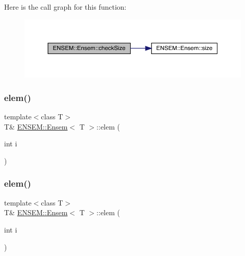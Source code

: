 Here is the call graph for this function\+:
\nopagebreak
\begin{figure}[H]
\begin{center}
\leavevmode
\includegraphics[width=350pt]{d7/d3e/classENSEM_1_1Ensem_a4c06fadea7b637572de2347739b78004_cgraph}
\end{center}
\end{figure}
\mbox{\label{classENSEM_1_1Ensem_a4927ebde99b1f0a03cdcfe3fc88458a5}} 
\subsubsection{\texorpdfstring{elem()}{elem()}\hspace{0.1cm}{\footnotesize\ttfamily [1/6]}}
{\footnotesize\ttfamily template$<$class T$>$ \\
T\& \mbox{\hyperlink{classENSEM_1_1Ensem}{E\+N\+S\+E\+M\+::\+Ensem}}$<$ T $>$\+::elem (\begin{DoxyParamCaption}\item[{int}]{i }\end{DoxyParamCaption})\hspace{0.3cm}{\ttfamily [inline]}}

\mbox{\label{classENSEM_1_1Ensem_a4927ebde99b1f0a03cdcfe3fc88458a5}} 
\subsubsection{\texorpdfstring{elem()}{elem()}\hspace{0.1cm}{\footnotesize\ttfamily [2/6]}}
{\footnotesize\ttfamily template$<$class T$>$ \\
T\& \mbox{\hyperlink{classENSEM_1_1Ensem}{E\+N\+S\+E\+M\+::\+Ensem}}$<$ T $>$\+::elem (\begin{DoxyParamCaption}\item[{int}]{i }\end{DoxyParamCaption})\hspace{0.3cm}{\ttfamily [inline]}}

